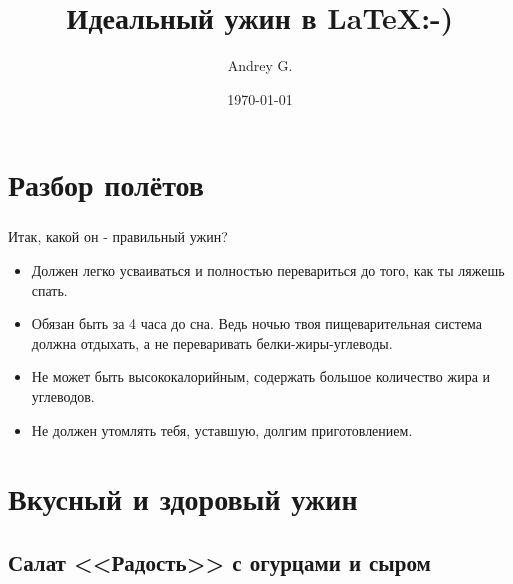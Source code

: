 \documentclass[t,hyperref={pdftex,unicode}]{beamer}  %
\title{Идеальный ужин в \LaTeX :-)}
\author{Andrey G.}
\date{\today}
\begin{document}
\begin{frame}
\maketitle
\end{frame}

\section{Разбор полётов}

\begin{frame}
	\frametitle{\insertsection}
	Итак, какой он - правильный ужин? \pause
	\begin{itemize}
	\item Должен легко усваиваться и полностью перевариться до того, как ты ляжешь спать. \pause
	\item Обязан быть за 4 часа до сна. Ведь ночью твоя пищеварительная система должна отдыхать, а не переваривать белки-жиры-углеводы. \pause
	\item Не может быть высококалорийным, содержать большое количество жира и углеводов. \pause
	\item Не должен утомлять тебя, уставшую, долгим приготовлением.
	\end{itemize}
	
\end{frame}

\section{Вкусный и здоровый ужин}

\subsection{Салат <<Радость>> с огурцами и сыром}
\end{document}
